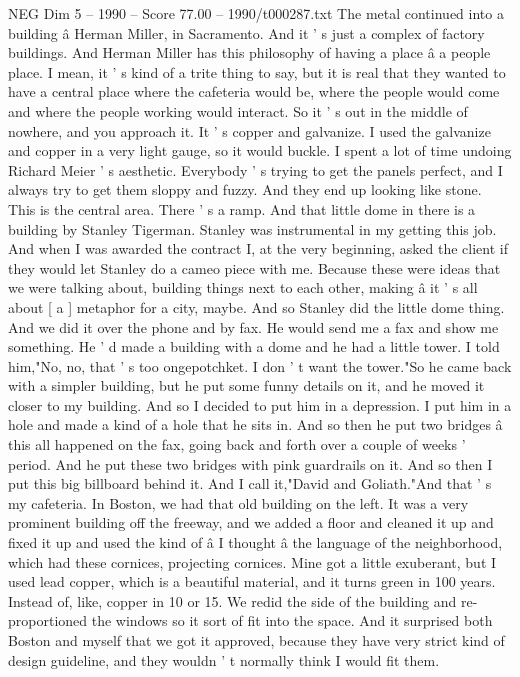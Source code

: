 \begin{textsample}{NEG Dim 5 – 1990 – Score 77.00 – 1990/t000287.txt}
The metal continued into a building â Herman Miller, in Sacramento.
And it ' s just a complex of factory buildings.
And Herman Miller has this philosophy of having a place â a people place.
I mean, it ' s kind of a trite thing to say, but it is real that they wanted to have a central place where the cafeteria would be, where the people would come and where the people working would interact.
So it ' s out in the middle of nowhere, and you approach it.
It ' s copper and galvanize.
I used the galvanize and copper in a very light gauge, so it would buckle.
I spent a lot of time undoing Richard Meier ' s aesthetic.
Everybody ' s trying to get the panels perfect, and I always try to get them sloppy and fuzzy.
And they end up looking like stone.
This is the central area.
There ' s a ramp.
And that little dome in there is a building by Stanley Tigerman.
Stanley was instrumental in my getting this job.
And when I was awarded the contract I, at the very beginning, asked the client if they would let Stanley do a cameo piece with me.
Because these were ideas that we were talking about, building things next to each other, making â it ' s all about [ a ] metaphor for a city, maybe.
And so Stanley did the little dome thing.
And we did it over the phone and by fax.
He would send me a fax and show me something.
He ' d made a building with a dome and he had a little tower.
I told him,"No, no, that ' s too ongepotchket.
I don ' t want the tower."So he came back with a simpler building, but he put some funny details on it, and he moved it closer to my building.
And so I decided to put him in a depression.
I put him in a hole and made a kind of a hole that he sits in.
And so then he put two bridges â this all happened on the fax, going back and forth over a couple of weeks ' period.
And he put these two bridges with pink guardrails on it.
And so then I put this big billboard behind it.
And I call it,"David and Goliath."And that ' s my cafeteria.
In Boston, we had that old building on the left.
It was a very prominent building off the freeway, and we added a floor and cleaned it up and fixed it up and used the kind of â I thought â the language of the neighborhood, which had these cornices, projecting cornices.
Mine got a little exuberant, but I used lead copper, which is a beautiful material, and it turns green in 100 years.
Instead of, like, copper in 10 or 15.
We redid the side of the building and re-proportioned the windows so it sort of fit into the space.
And it surprised both Boston and myself that we got it approved, because they have very strict kind of design guideline, and they wouldn ' t normally think I would fit them.

\end{textsample}
